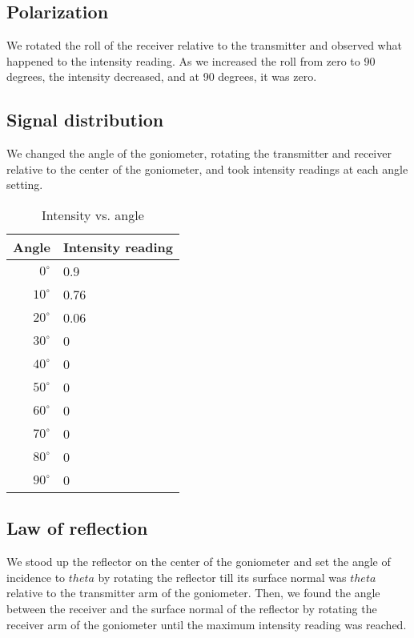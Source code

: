 \documentclass[11pt, titlepage, letterpaper, twoside]{article}
\begin{document}
\subsection{Polarization}

We rotated the roll of the receiver relative to the transmitter and observed what happened to the intensity reading.
As we increased the roll from zero to 90 degrees, the intensity decreased, and at 90 degrees, it was zero.

\subsection{Signal distribution}

We changed the angle of the goniometer, rotating the transmitter and receiver relative to the center of the
goniometer, and took intensity readings at each angle setting.

\begin{table}[h!]
\centering
\caption{Intensity vs. angle}
\label{Ixt}
\begin{tabular}{|r|l|}
\hline
Angle        & Intensity reading \\ \hline
$0^{\circ}$  & 0.9               \\ \hline
$10^{\circ}$ & 0.76              \\ \hline
$20^{\circ}$ & 0.06              \\ \hline
$30^{\circ}$ & 0                 \\ \hline
$40^{\circ}$ & 0                 \\ \hline
$50^{\circ}$ & 0                 \\ \hline
$60^{\circ}$ & 0                 \\ \hline
$70^{\circ}$ & 0                 \\ \hline
$80^{\circ}$ & 0                 \\ \hline
$90^{\circ}$ & 0                 \\ \hline
\end{tabular}
\end{table}

\pagebreak

\subsection{Law of reflection}

We stood up the reflector on the center of the goniometer and set the angle of incidence to $theta$ by
rotating the reflector till its surface normal was $theta$ relative to the transmitter arm of the
goniometer. Then, we found the angle between the receiver and the surface normal of the reflector by
rotating the receiver arm of the goniometer until the maximum intensity reading was reached.
\end{document}
